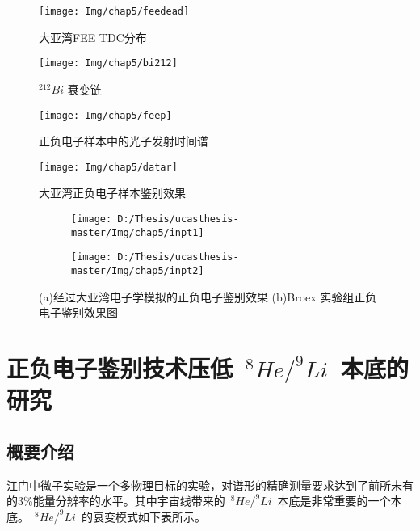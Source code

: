 \begin{figure}[!htbp]
  \centering
   \texttt{[image: Img/chap5/feedead]}
    \caption{大亚湾FEE TDC分布}
  \label{fig:feedead}
\end{figure}
\begin{figure}[!htbp]
  \centering
   \texttt{[image: Img/chap5/bi212]}
    \caption{$^{212}Bi$ 衰变链}
  \label{fig:bi212}
\end{figure}
\begin{figure}[!htbp]
  \centering
   \texttt{[image: Img/chap5/feep]}
    \caption{正负电子样本中的光子发射时间谱}
  \label{fig:feep}
\end{figure}
\begin{figure}[!htbp]
  \centering
   \texttt{[image: Img/chap5/datar]}
    \caption{大亚湾正负电子样本鉴别效果}
  \label{fig:datar}
\end{figure}
\begin{figure}[!htbp]
  \centering
  \begin{subfigure}[b]{\MySubFactor\textwidth}
    \texttt{[image: D:/Thesis/ucasthesis-master/Img/chap5/inpt1]}
    \caption{}
    \label{fig:inpt_1}
  \end{subfigure}%
  \quad\quad\quad\quad\quad\quad%
  \begin{subfigure}[b]{\MySubFactor\textwidth}
    \texttt{[image: D:/Thesis/ucasthesis-master/Img/chap5/inpt2]}
    \caption{}
    \label{fig:inpt_2}
  \end{subfigure}
  \caption{(a)经过大亚湾电子学模拟的正负电子鉴别效果 (b)Broex 实验组正负电子鉴别效果图}
  \label{fig:inpt}
\end{figure}
\section{正负电子鉴别技术压低~$^{8}He/^{9}Li$~本底的研究}
\subsection{概要介绍}
江门中微子实验是一个多物理目标的实验，对谱形的精确测量要求达到了前所未有的3\%能量分辨率的水平。其中宇宙线带来的~$^{8}He/^{9}Li$~本底是非常重要的一个本底。~$^{8}He/^{9}Li$~的衰变模式如下表所示。

